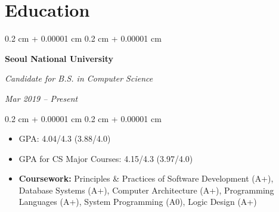 \documentclass[10pt, letterpaper]{article}
\newenvironment{highlights}{
    \begin{itemize}[
        topsep=0.10 cm,
        parsep=0.10 cm,
        partopsep=0pt,
        itemsep=0pt,
        leftmargin=0.4 cm + 10pt
    ]
}{
    \end{itemize}
} %
\newenvironment{highlightsforbulletentries}{
    \begin{itemize}[
        topsep=0.10 cm,
        parsep=0.10 cm,
        partopsep=0pt,
        itemsep=0pt,
        leftmargin=10pt
    ]
}{
    \end{itemize}
} %
\newenvironment{onecolentry}{
    \begin{adjustwidth}{
        0.2 cm + 0.00001 cm
    }{
        0.2 cm + 0.00001 cm
    }
}{
    \end{adjustwidth}
} %
\newenvironment{twocolentry}[2][]{
    \onecolentry
    \def\secondColumn{#2}
    \setcolumnwidth{\fill, 4.5 cm}
    \begin{paracol}{2}
}{
    \switchcolumn \raggedleft \secondColumn
    \end{paracol}
    \endonecolentry
} %
\let\hrefWithoutArrow\href
\renewcommand{\href}[2]{\hrefWithoutArrow{#1}{\ifthenelse{\equal{#2}{}}{ }{#2 }\raisebox{.15ex}{\footnotesize \faExternalLink*}}}
\begin{document}

    










    \section{Education}
        
        \begin{twocolentry}{    
        \textit{Mar 2019 – Present}}
            \textbf{Seoul National University}

            \textit{Candidate for B.S. in Computer Science}
        \end{twocolentry}

        \vspace{0.10 cm}
        \begin{onecolentry}
            \begin{highlights}
                \item GPA: 4.04/4.3 (3.88/4.0)
                \item GPA for CS Major Courses: 4.15/4.3 (3.97/4.0)
                \item \textbf{Coursework:} Principles \& Practices of Software Development (A+), Database Systems (A+), Computer Architecture (A+), Programming Languages (A+), System Programming (A0), Logic Design (A+)
            \end{highlights}
        \end{onecolentry}
\end{document}
